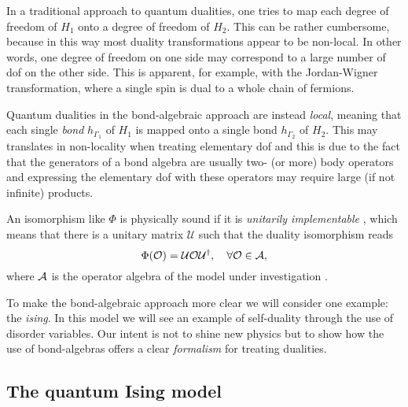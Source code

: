 In a traditional approach to quantum dualities, one tries to map each degree of freedom of $H_1$ onto a degree of freedom of $H_2$.
This can be rather cumbersome, because in this way most duality transformations appear to be non-local.
In other words, one degree of freedom on one side may correspond to a large number of \ac{dof} on the other side.
This is apparent, for example, with the Jordan-Wigner transformation, where a single spin is dual to a whole chain of fermions.

Quantum dualities in the bond-algebraic approach are instead \emph{local}, meaning that each single \emph{bond} $h_{\Gamma_1}$ of $H_1$ is mapped onto a single bond $h_{\Gamma_2}$ of $H_2$.
This may translates in non-locality when treating elementary \ac{dof} and this is due to the fact that the generators of a bond algebra are usually two- (or more) body operators and expressing the elementary \ac{dof} with these operators may require large (if not infinite) products.

An isomorphism like $\Phi$ is physically sound if it is \emph{unitarily implementable} \cite{cobanera2011bond}, which means that there is a unitary matrix $\mathcal{U}$ such that the duality isomorphism reads
\begin{equation}
    \Phi(\mathcal{O}) =
    \mathcal{U} \mathcal{O} \mathcal{U}^{\dagger}, \quad
    \forall \mathcal{O} \in \mathcal{A},
\end{equation}
where $\mathcal{A}$ is the operator algebra of the model under investigation \cite{cobanera2011bond}.


To make the bond-algebraic approach more clear we will consider one example: the \emph{\acf{ising}}.
In this model we will see an example of self-duality through the use of disorder variables.
Our intent is not to shine new physics but to show how the use of bond-algebras offers a clear \emph{formalism} for treating dualities.



\subsection{The quantum Ising model}
\label{sub:the_quantum_ising_model}


